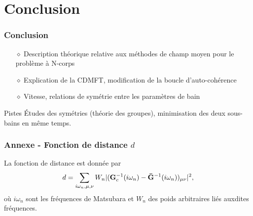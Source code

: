 
\section{Conclusion}

\begin{frame}
    \begin{center}
    \vspace{0.5cm}
    \end{center}
\end{frame}

\begin{frame}
    \frametitle{Conclusion}
    \begin{itemize}
        \setlength\itemsep{1em}
        \item[$\diamond$] Description théorique relative aux méthodes de champ moyen pour le problème à N-corps
        \item[$\diamond$] Explication de la CDMFT, modification de la boucle d'auto-cohérence
        \item[$\diamond$] Vitesse, relations de symétrie entre les paramètres de bain
    \end{itemize}
    \vspace{0.5cm}
    \begin{colorblock}{Pistes}
        Études des symétries (théorie des groupes), minimisation des deux sous-bains en même temps.
    \end{colorblock}
\end{frame}

\begin{frame}
    \begin{center}
    \vspace{0.5cm}
    \end{center}
\end{frame}

\begin{frame}
    \frametitle{Annexe - Fonction de distance $d$}
    La fonction de distance est donnée par
    \begin{align}
        d = \sum_{i\omega_n, \mu, \nu}W_n|(\vb{G}_c^{-1}(i\omega_n) - \vb{\Bar{G}}^{-1}(i\omega_n))_{\mu\nu}|^2,
        \label{eq: dist}
    \end{align}
    où $i\omega_n$ sont les fréquences de Matsubara et $W_n$ des poids arbitraires
    liés auxdites fréquences.
\end{frame}

